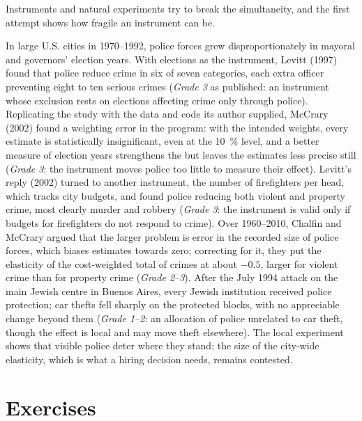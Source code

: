 Instruments and natural experiments try to break the simultaneity, and the first
attempt shows how fragile an instrument can be.

\begin{debate}
In large U.S. cities in 1970--1992, police forces grew disproportionately in mayoral and
governors' election years. With elections as the instrument, Levitt (1997) found that
police reduce crime in six of seven categories, each extra officer preventing eight to
ten serious crimes (\emph{Grade 3} as published: an instrument whose exclusion rests
on elections affecting crime only through police). %
Replicating the study with the data and code its author supplied, McCrary (2002)
found a weighting error in the program: with the intended weights, every estimate is
statistically insignificant, even at the 10~\% level, and a better measure of election
years strengthens the  but leaves the estimates less precise still
(\emph{Grade 3}: the instrument moves police too little to measure their effect).
Levitt's reply (2002) turned to another instrument, the number of firefighters per
head, which tracks city budgets, and found police reducing both violent and property
crime, most clearly murder and robbery (\emph{Grade 3}: the instrument is valid only
if budgets for firefighters do not respond to crime). %
Over 1960--2010, Chalfin and McCrary argued that the larger problem is error in the
recorded size of police forces, which biases estimates towards zero; correcting for
it, they put the elasticity of the cost-weighted total of crimes at about $-0.5$, larger
for violent crime than for property crime (\emph{Grade 2--3}). %
After the July 1994 attack on the main Jewish centre in Buenos Aires, every Jewish
institution received police protection; car thefts fell sharply on the protected
blocks, with no appreciable change beyond them (\emph{Grade 1--2}: an allocation of
police unrelated to car theft, though the effect is local and may move theft
elsewhere). %
The local experiment shows that visible police deter where they stand; the size of
the city-wide elasticity, which is what a hiring decision needs, remains contested.
\end{debate}

\section{Exercises}\label{sec:b3:institutions:exercises}

